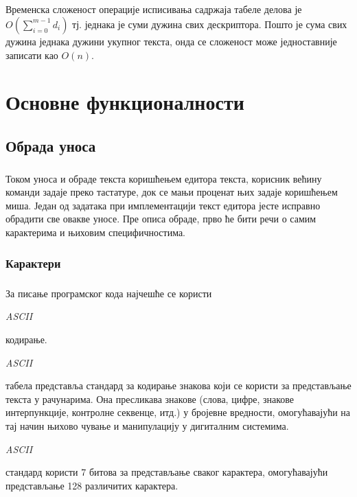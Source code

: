 \documentclass[12pt,oneside]{memoir}
\begin{document}
\paragraph{}
Временска сложеност операције исписивања садржаја табеле делова је 
\(O(\sum_{i=0}^{m-1} d_i)\) тј. једнака је суми дужина свих дескриптора. 
Пошто је сума свих дужина једнака дужини укупног текста, онда се сложеност може
једноставније записати као \(O(n)\).

\chapter{Основне функционалности}
\label{chp:osnovne_funkcionalnosti}

\section{Обрада уноса}
\paragraph{}
Током уноса и обраде текста коришћењем едитора текста, корисник већину команди задаје преко тастатуре, док се мањи проценат њих задаје коришћењем миша. Један од задатака при 
имплементацији текст едитора јесте исправно обрадити све овакве уносе. 
Пре описа обраде, прво ће бити речи о самим карактерима и њиховим специфичностима. 

\subsection{Карактери}
\paragraph{}
За писање програмског кода најчешће се користи \begin{latinica}\textit{ASCII}\end{latinica} кодирање. \begin{latinica}\textit{ASCII}\end{latinica} табела представља стандард за кодирање
знакова који се користи за представљање текста у рачунарима. Она пресликава знакове
(слова, цифре, знакове интерпункције, контролне секвенце, итд.) у бројевне вредности,
омогућавајући на тај начин њихово чување и манипулацију у дигиталним системима. 
\begin{latinica}\textit{ASCII}\end{latinica} стандард користи 7 битова за представљање
сваког карактера, омогућавајући представљање 128 различитих карактера.
\end{document}
